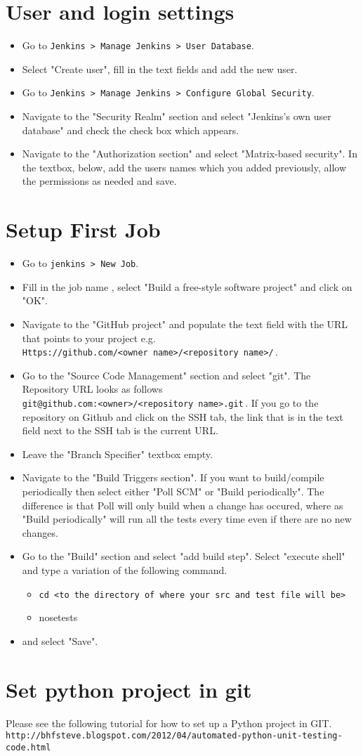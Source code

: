 \documentclass{article}
\begin{document}
\section{User and login settings}
\begin{itemize}
\item{Go to \verb#Jenkins > Manage Jenkins > User Database#.}
\item{Select "Create user", fill in the text fields and add the new user.}
\item{Go to \verb#Jenkins > Manage Jenkins > Configure Global Security#.}
\item{Navigate to the "Security Realm" section and select "Jenkins's own user database" and check the check box which appears.}
\item{Navigate to the "Authorization section" and select "Matrix-based security". In the textbox, below, add the users names which you added previously, allow the permissions as needed and save.}
\end{itemize}

\section{Setup First Job}
\begin{itemize}
\item{Go to \verb#jenkins > New Job#.}
\item{Fill in the job name , select "Build a free-style software project" and
click on "OK".}
\item{Navigate to the "GitHub project" and populate the text field with the URL that points to
your project e.g.\\\verb#Https://github.com/<owner name>/<repository name>/#\,.}
\item{Go to the "Source Code Management" section and select "git". The Repository URL looks as follows \\\verb#git@github.com:<owner>/<repository name>.git#\,.}
If you go to the repository on Github and click on the SSH tab, the link that is in the text field next to the SSH tab is the current URL.
\item{Leave the "Branch Specifier" textbox empty.}
\item{Navigate to the "Build Triggers section". If you want to build/compile periodically then select either "Poll SCM" or "Build periodically". The difference is that Poll will only build when a change has occured, where as "Build periodically" will run all the tests every time even if there are no new changes.}
\item{Go to the "Build" section and select "add build step". Select "execute shell" and type a variation of the following command.
\begin{itemize}
\item{\verb#cd <to the directory of where your src and test file will be>#}
\item nosetests   
\end{itemize}}
\item{and select "Save".}
\end{itemize}

\section{Set python project in git}
Please see the following tutorial for how to set up a Python project in GIT. \\
\verb#http://bhfsteve.blogspot.com/2012/04/automated-python-unit-testing-code.html#
\end{document}
